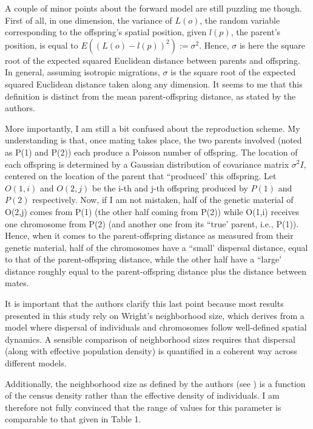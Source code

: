 \begin{point}{}
A couple of minor points about the forward model are still puzzling me though. First of all, in one dimension, the variance of $L(o)$, the random variable corresponding to the offspring's spatial position, given $l(p)$, the parent's position, is equal to $E((L(o)-l(p))^2):=\sigma^2$. Hence, $\sigma$ is here the square root of the expected squared Euclidean distance between parents and offspring. In general, assuming isotropic migrations, $\sigma$ is the square root of the expected squared Euclidean distance taken along any dimension. It seems to me that this definition is distinct from the mean parent-offspring distance, as stated by the authors.
\end{point}


\begin{point}{}
More importantly, I am still a bit confused about the reproduction scheme. My understanding is that, once mating takes place, the two parents involved (noted as P(1) and P(2)) each produce a Poisson number of offspring. The location of each offspring is determined by a Gaussian distribution of covariance matrix $\sigma^2 I$, centered on the location of the parent that ``produced' this offspring. Let $O(1,i)$ and $O(2,j)$ be the i-th and j-th offspring produced by $P(1)$ and $P(2)$ respectively. Now, if I am not mistaken, half of the genetic material of O(2,j) comes from P(1) (the other half coming from P(2)) while O(1,i) receives one chromosome from P(2) (and another one from its ``true' parent, i.e., P(1)). Hence, when it comes to the parent-offspring distance as measured from their genetic material, half of the chromosomes have a ``small' dispersal distance, equal to that of the parent-offspring distance, while the other half have a ``large' distance roughly equal to the parent-offspring distance plus the distance between mates.

It is important that the authors clarify this last point because most results presented in this study rely on Wright's neighborhood size, which derives from a model where dispersal of individuals and chromosomes follow well-defined spatial dynamics. A sensible comparison of neighborhood sizes requires that dispersal (along with effective population density) is quantified in a coherent way across different models.

    Additionally, the neighborhood size as defined by the authors (see ) is a function of the census density rather than the effective density of individuals. I am therefore not fully convinced that the range of values for this parameter is comparable to that given in Table 1.
\end{point}

